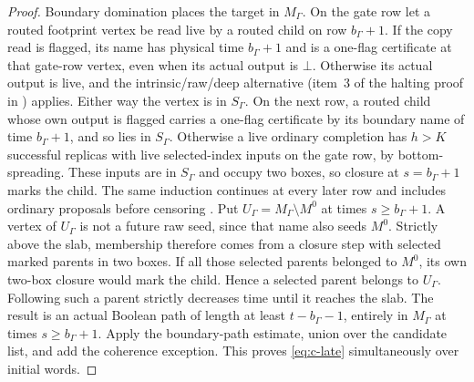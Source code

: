 \begin{proof}
Boundary domination places the target in \(M_\Gamma\).
On the gate row let a routed footprint vertex be read live by a routed
child on row \(b_\Gamma+1\). If the copy read is flagged, its name has
physical time \(b_\Gamma+1\) and is a one-flag certificate at that
gate-row vertex, even when its actual output is \(\bot\). Otherwise its
actual output is live, and the intrinsic/raw/deep alternative (item~3
of the halting proof in \cite[Section~11.7]{DMNoise2026}) applies.
Either way the vertex is in \(S_\Gamma\). On the next row, a routed
child whose own output is flagged carries a one-flag certificate by its
boundary name of time \(b_\Gamma+1\), and so lies in \(S_\Gamma\).
Otherwise a live ordinary completion has \(h>K\) successful replicas
with live selected-index inputs on the gate row, by bottom-spreading.
These inputs are in \(S_\Gamma\) and occupy two boxes, so closure at
\(s=b_\Gamma+1\) marks the child.
The same induction continues at every later row and includes ordinary
proposals before censoring
\cite[Lemma~11.6, domination paragraph]{DMNoise2026}.
Put \(U_\Gamma=M_\Gamma\setminus M^0\) at times
\(s\ge b_\Gamma+1\). A vertex of \(U_\Gamma\) is not a future raw
seed, since that name also seeds \(M^0\). Strictly above the slab,
membership therefore comes from a closure step with selected marked
parents in two boxes. If all those selected parents belonged to
\(M^0\), its own two-box closure would mark the child.
Hence a selected parent belongs to \(U_\Gamma\). Following such a
parent strictly decreases time until it reaches the slab.
The result is an actual Boolean path of length at least
\(t-b_\Gamma-1\), entirely in \(M_\Gamma\) at times
\(s\ge b_\Gamma+1\). Apply the
boundary-path estimate, union over the candidate list, and add the
coherence exception. This proves \eqref{eq:c-late} simultaneously over
initial words.
\end{proof}

